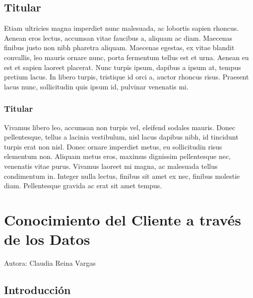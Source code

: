 \documentclass[
  letterpaper,
  DIV=11,
  numbers=noendperiod]{scrreprt}
\begin{document}
\hypertarget{titular-14}{%
\section{Titular}\label{titular-14}}

Etiam ultricies magna imperdiet nunc malesuada, ac lobortis sapien
rhoncus. Aenean eros lectus, accumsan vitae faucibus a, aliquam ac diam.
Maecenas finibus justo non nibh pharetra aliquam. Maecenas egestas, ex
vitae blandit convallis, leo mauris ornare nunc, porta fermentum tellus
est et urna. Aenean eu est et sapien laoreet placerat. Nunc turpis
ipsum, dapibus a ipsum at, tempus pretium lacus. In libero turpis,
tristique id orci a, auctor rhoncus risus. Praesent lacus nunc,
sollicitudin quis ipsum id, pulvinar venenatis mi.

\hypertarget{titular-15}{%
\subsection{Titular}\label{titular-15}}

Vivamus libero leo, accumsan non turpis vel, eleifend sodales mauris.
Donec pellentesque, tellus a lacinia vestibulum, nisl lacus dapibus
nibh, id tincidunt turpis erat non nisl. Donec ornare imperdiet metus,
eu sollicitudin risus elementum non. Aliquam metus eros, maximus
dignissim pellentesque nec, venenatis vitae purus. Vivamus laoreet mi
magna, ac malesuada tellus condimentum in. Integer nulla lectus, finibus
sit amet ex nec, finibus molestie diam. Pellentesque gravida ac erat sit
amet tempus.


\hypertarget{conocimiento-del-cliente-a-travuxe9s-de-los-datos}{%
\chapter{Conocimiento del Cliente a través de los
Datos}\label{conocimiento-del-cliente-a-travuxe9s-de-los-datos}}

Autora: Claudia Reina Vargas

\hypertarget{introducciuxf3n-1}{%
\section{Introducción}\label{introducciuxf3n-1}}
\end{document}
